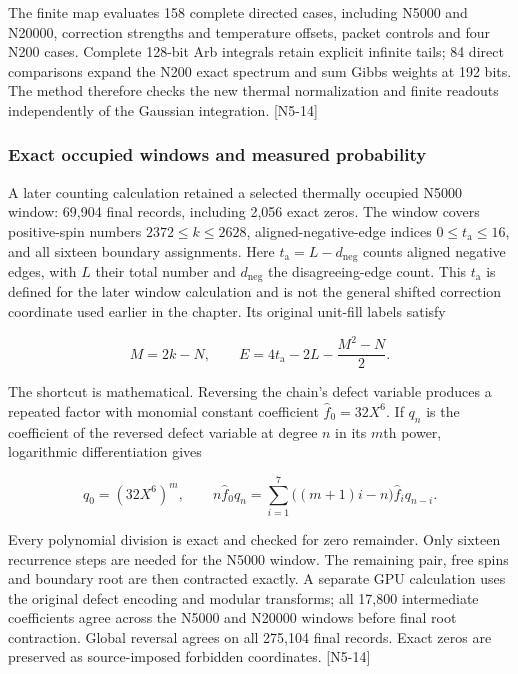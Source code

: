 The finite map evaluates 158 complete directed cases, including N5000 and N20000, correction strengths and temperature offsets, packet controls and four N200 cases. Complete 128-bit Arb integrals retain explicit infinite tails; 84 direct comparisons expand the N200 exact spectrum and sum Gibbs weights at 192 bits. The method therefore checks the new thermal normalization and finite readouts independently of the Gaussian integration. {[}N5-14{]}

\subsubsection{Exact occupied windows and measured probability}\label{exact-occupied-windows-and-measured-probability}

A later counting calculation retained a selected thermally occupied N5000 window: 69,904 final records, including 2,056 exact zeros. The window covers positive-spin numbers \(2372\le k\le2628\), aligned-negative-edge indices \(0\le t_{\mathrm{a}}\le16\), and all sixteen boundary assignments. Here \(t_{\mathrm{a}}=L-d_{\mathrm{neg}}\) counts aligned negative edges, with \(L\) their total number and \(d_{\mathrm{neg}}\) the disagreeing-edge count. This \(t_{\mathrm{a}}\) is defined for the later window calculation and is not the general shifted correction coordinate used earlier in the chapter. Its original unit-fill labels satisfy

\[M=2k-N,\qquad
E=4t_{\mathrm{a}}-2L-\frac{M^2-N}{2}.\]

The shortcut is mathematical. Reversing the chain's defect variable produces a repeated factor with monomial constant coefficient \(\widehat f_0=32X^6\). If \(q_n\) is the coefficient of the reversed defect variable at degree \(n\) in its \(m\)th power, logarithmic differentiation gives

\[q_0=(32X^6)^m,\qquad
n\widehat f_0q_n=\sum_{i=1}^{7}\bigl((m+1)i-n\bigr)\widehat f_iq_{n-i}.\]

Every polynomial division is exact and checked for zero remainder. Only sixteen recurrence steps are needed for the N5000 window. The remaining pair, free spins and boundary root are then contracted exactly. A separate GPU calculation uses the original defect encoding and modular transforms; all 17,800 intermediate coefficients agree across the N5000 and N20000 windows before final root contraction. Global reversal agrees on all 275,104 final records. Exact zeros are preserved as source-imposed forbidden coordinates. {[}N5-14{]}

